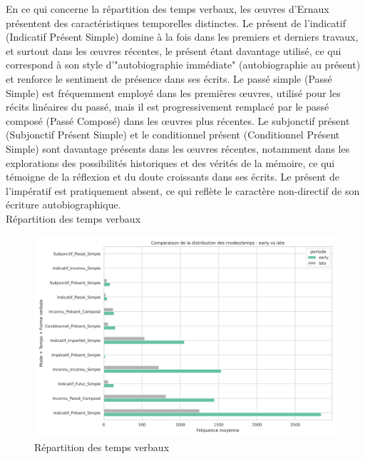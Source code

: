 En ce qui concerne la répartition des temps verbaux, les œuvres d'Ernaux présentent des caractéristiques temporelles distinctes. Le présent de l'indicatif (Indicatif Présent Simple) domine à la fois dans les premiers et derniers travaux, et surtout dans les œuvres récentes, le présent étant davantage utilisé, ce qui correspond à son style d'"autobiographie immédiate" (autobiographie au présent) et renforce le sentiment de présence dans ses écrits. Le passé simple (Passé Simple) est fréquemment employé dans les premières œuvres, utilisé pour les récits linéaires du passé, mais il est progressivement remplacé par le passé composé (Passé Composé) dans les œuvres plus récentes. Le subjonctif présent (Subjonctif Présent Simple) et le conditionnel présent (Conditionnel Présent Simple) sont davantage présents dans les œuvres récentes, notamment dans les explorations des possibilités historiques et des vérités de la mémoire, ce qui témoigne de la réflexion et du doute croissants dans ses écrits. Le présent de l’impératif est pratiquement absent, ce qui reflète le caractère non-directif de son écriture autobiographique.\\
 Répartition des temps verbaux
\begin{figure}[ht!]
    \centering
    \includegraphics[width=\textwidth]{image/Comparaison_de_la_distribution_des_modes_temps_early_vs_late.png}
    \caption{Répartition des temps verbaux}
    \label{fig:temps verbaux}
\end{figure}

